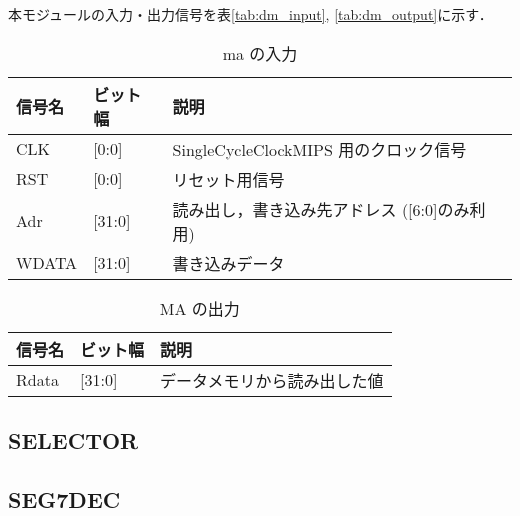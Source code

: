 本モジュールの入力・出力信号を表\ref{tab:dm_input}, \ref{tab:dm_output}に示す．
\begin{table}[h]
  \caption{ma の入力}
  \centering
  \begin{tabular}{l|l|l}
    信号名 & ビット幅 & 説明 \\
    \hline
    CLK & [0:0] & SingleCycleClockMIPS 用のクロック信号 \\
    RST & [0:0] & リセット用信号 \\
    Adr & [31:0] & 読み出し，書き込み先アドレス ([6:0]のみ利用) \\
    WDATA & [31:0] & 書き込みデータ \\
  \end{tabular}
  \label{tab:ma_input}
\end{table}
\begin{table}[h]
  \caption{MA の出力}
  \centering
  \begin{tabular}{l|l|l}
    信号名 & ビット幅 & 説明 \\
    \hline
    Rdata & [31:0] & データメモリから読み出した値 \\
  \end{tabular}
  \label{tab:ma_output}
\end{table}

\subsection{SELECTOR}


\subsection{SEG7DEC}

